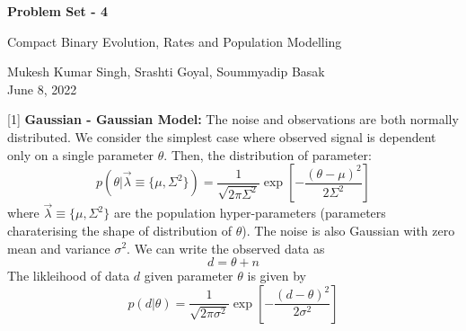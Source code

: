 \documentclass{article} %
\newcommand{\question}[2][]{\begin{flushleft}
        \textbf{Problem #1}: %
\end{flushleft}
}
\newcommand{\maketitletwo}[2][]{\begin{center}
        \Large{\textbf{Problem Set - 4}
            
            Compact Binary Evolution, Rates and Population Modelling} %
        \vspace{10pt}
        
        \normalsize{Mukesh Kumar Singh, Srashti Goyal, Soummyadip Basak  %
        } \\
        \vspace{5pt}  June 8, 2022     %
        \vspace{15pt}
        
\end{center}}
\begin{document}
    \maketitletwo[5]  %
    
    \question[1]{} \textbf{Gaussian - Gaussian Model:}  The noise and observations are both normally distributed. We consider the simplest case where observed signal is dependent only on a single parameter $\theta$. Then, the distribution of parameter:
    \begin{equation}
    p(\theta|\Vec{\lambda} \equiv \{\mu, \Sigma^2\}) = \frac{1}{\sqrt{2 \pi  \Sigma^2}} \exp \left[ -\frac{(\theta-\mu)^2}{2 \Sigma^2}\right]
    \end{equation}
    where $\Vec{\lambda} \equiv \{\mu, \Sigma^2\}$ are the population hyper-parameters (parameters charaterising the shape of distribution of $\theta$). The noise is also Gaussian with zero mean and variance $\sigma^2$. We can write the observed data as
    \begin{equation}
        d = \theta + n
    \end{equation}
    The likleihood of data $d$ given parameter $\theta$ is given by 
    \begin{equation}
        p(d|\theta) = \frac{1}{\sqrt{2 \pi  \sigma^2}} \exp \left[ -\frac{(d - \theta)^2}{2 \sigma^2}\right]
    \end{equation}
\end{document}
